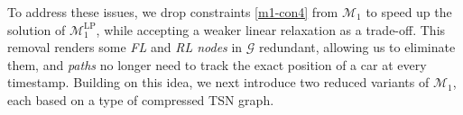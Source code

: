 \documentclass[12pt]{article}
\begin{document}


To address these issues, we drop constraints \eqref{m1-con4} from $\mathcal{M}_1$ to speed up the solution of $\mathcal{M}^{\text{LP}}_1$, while accepting a weaker linear relaxation as a trade-off. This removal renders some \textit{FL} and \textit{RL nodes} in $\mathcal{G}$ redundant, allowing us to eliminate them, and \textit{paths} no longer need to track the exact position of a car at every timestamp. Building on this idea, we next introduce two reduced variants of $\mathcal{M}_1$, each based on a type of compressed TSN graph.


\end{document}
